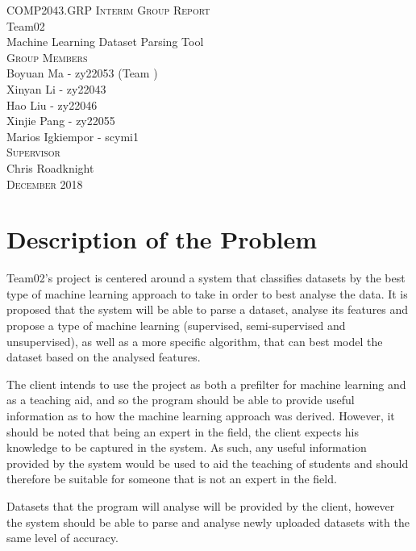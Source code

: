 \documentclass[a4paper,titlepage]{article}
\begin{document}
\begin{titlepage}
  \centering
  \large{\textsc{COMP2043.GRP Interim Group Report}}\\
  \vspace{3cm}
  \huge{Team02}\\
  \Huge{Machine Learning Dataset Parsing Tool}\\
  \vspace{3cm}
  \LARGE{\textsc{Group Members}}\\
  \Large{Boyuan Ma - zy22053 (Team )}\\
  \Large{Xinyan Li - zy22043}\\
  \Large{Hao Liu - zy22046}\\
  \Large{Xinjie Pang - zy22055}\\
  \Large{Marios Igkiempor - scymi1}\\
  \vspace{1cm}
  \LARGE{\textsc{Supervisor}}\\
  \Large{Chris Roadknight}\\
  \vfill
  \large{\textsc{December 2018}}

\end{titlepage}

\tableofcontents
\pagebreak

\section{Description of the Problem}
Team02's project is centered around a system that classifies datasets by the best type of machine learning approach to take in order to best analyse the data.
It is proposed that the system will be able to parse a dataset, analyse its features and propose a type of machine learning (supervised, semi-supervised and unsupervised), as well as a more specific algorithm, that can best model the dataset based on the analysed features.

The client intends to use the project as both a prefilter for machine learning and as a teaching aid, and so the program should be able to provide useful information as to how the machine learning approach was derived.
However, it should be noted that being an expert in the field, the client expects his knowledge to be captured in the system.
As such, any useful information provided by the system would be used to aid the teaching of students and should therefore be suitable for someone that is not an expert in the field.

Datasets that the program will analyse will be provided by the client, however the system should be able to parse and analyse newly uploaded datasets with the same level of accuracy.
\end{document}
